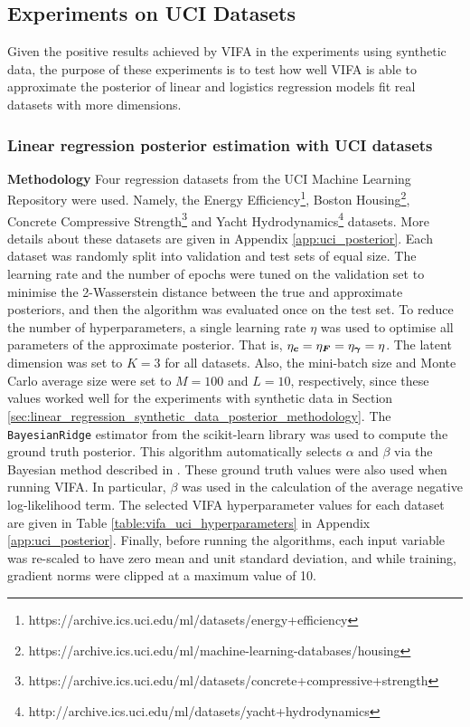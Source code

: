 \documentclass[10pt]{article} %
\newcommand{\vgamma}{\bm{\gamma}}
\begin{document}
\subsection{Experiments on UCI Datasets}
Given the positive results achieved by VIFA in the experiments using synthetic data, the purpose of these experiments is to test how well VIFA is able to approximate the posterior of linear and logistics regression models fit real datasets with more dimensions.

\subsubsection{Linear regression posterior estimation with UCI datasets}
\label{sec:vifa_posterior_uci}
\textbf{Methodology}  Four regression datasets from the UCI Machine Learning Repository \citep{dua2019} were used. Namely, the Energy Efficiency\footnote{https://archive.ics.uci.edu/ml/datasets/energy+efficiency}, Boston Housing\footnote{https://archive.ics.uci.edu/ml/machine-learning-databases/housing}, Concrete Compressive Strength\footnote{https://archive.ics.uci.edu/ml/datasets/concrete+compressive+strength} and Yacht Hydrodynamics\footnote{http://archive.ics.uci.edu/ml/datasets/yacht+hydrodynamics} datasets. More details about these datasets are given in Appendix \ref{app:uci_posterior}.  Each dataset was randomly split into validation and test sets of equal size. The learning rate and the number of epochs were tuned on the validation set to minimise the 2-Wasserstein distance between the true and approximate posteriors, and then the algorithm was evaluated once on the test set. To reduce the number of hyperparameters, a single learning rate $\eta$ was used to optimise all parameters of the approximate posterior. That is, $\eta_\vc = \eta_\mF = \eta_{\vgamma} = \eta$. The latent dimension was set to $K=3$ for all datasets. Also, the mini-batch size and Monte Carlo average size were set to $M=100$ and $L=10$, respectively, since these values worked well for the experiments with synthetic data in Section \ref{sec:linear_regression_synthetic_data_posterior_methodology}. The \texttt{BayesianRidge} estimator from the scikit-learn library \citep{pedregosa2012} was used to compute the ground truth posterior. This algorithm automatically selects $\alpha$ and $\beta$ via the Bayesian method described in \citep{mackay1992}. These ground truth values were also used when running VIFA. In particular, $\beta$ was used in the calculation of the average negative log-likelihood term. The selected VIFA hyperparameter values for each dataset are given in Table \ref{table:vifa_uci_hyperparameters} in Appendix \ref{app:uci_posterior}. Finally, before running the algorithms, each input variable was re-scaled to have zero mean and unit standard deviation, and while training, gradient norms were clipped at a maximum value of 10. 
\end{document}
